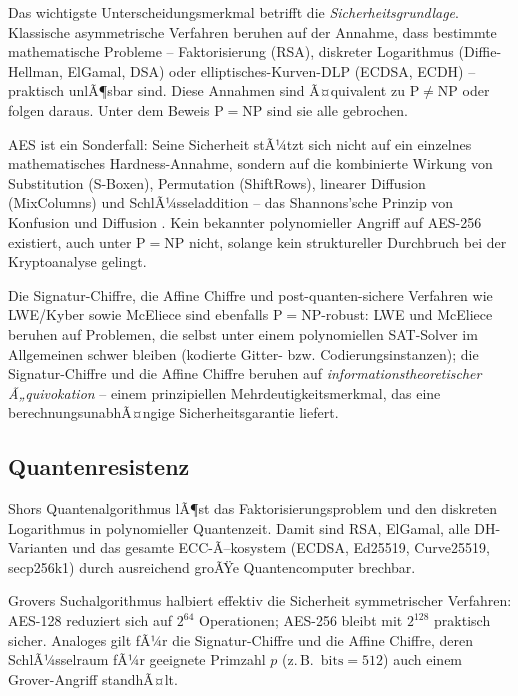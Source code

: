 ﻿\documentclass[a4paper,12pt]{scrreprt}
\theoremstyle{definition}
\begin{document}
Das wichtigste Unterscheidungsmerkmal betrifft die \emph{Sicherheitsgrundlage}. Klassische asymmetrische Verfahren beruhen auf der Annahme, dass bestimmte mathematische Probleme -- Faktorisierung (RSA), diskreter Logarithmus (Diffie-Hellman, ElGamal, DSA) oder elliptisches-Kurven-DLP (ECDSA, ECDH) -- praktisch unlÃ¶sbar sind. Diese Annahmen sind Ã¤quivalent zu $\mathrm{P}\neq\mathrm{NP}$ oder folgen daraus. Unter dem Beweis $\mathrm{P}=\mathrm{NP}$ \cite{Epp26a} sind sie alle gebrochen.

AES \cite{DR02} ist ein Sonderfall: Seine Sicherheit stÃ¼tzt sich nicht auf ein einzelnes mathematisches Hardness-Annahme, sondern auf die kombinierte Wirkung von Substitution (S-Boxen), Permutation (ShiftRows), linearer Diffusion (MixColumns) und SchlÃ¼sseladdition -- das Shannons'sche Prinzip von Konfusion und Diffusion \cite{Sha49}. Kein bekannter polynomieller Angriff auf AES-256 existiert, auch unter $\mathrm{P}=\mathrm{NP}$ nicht, solange kein struktureller Durchbruch bei der Kryptoanalyse gelingt.

Die Signatur-Chiffre, die Affine Chiffre \cite{Epp26c} und post-quanten-sichere Verfahren wie LWE/Kyber \cite{ABD+22} sowie McEliece \cite{McE78} sind ebenfalls $\mathrm{P}=\mathrm{NP}$-robust: LWE und McEliece beruhen auf Problemen, die selbst unter einem polynomiellen SAT-Solver im Allgemeinen schwer bleiben (kodierte Gitter- bzw. Codierungsinstanzen); die Signatur-Chiffre und die Affine Chiffre beruhen auf \emph{informationstheoretischer Ã„quivokation} -- einem prinzipiellen Mehrdeutigkeitsmerkmal, das eine berechnungsunabhÃ¤ngige Sicherheitsgarantie liefert.

\subsection{Quantenresistenz}

Shors Quantenalgorithmus \cite{Sho94} lÃ¶st das Faktorisierungsproblem und den diskreten Logarithmus in polynomieller Quantenzeit. Damit sind RSA, ElGamal, alle DH-Varianten und das gesamte ECC-Ã–kosystem (ECDSA, Ed25519, Curve25519, secp256k1) durch ausreichend groÃŸe Quantencomputer brechbar.

Grovers Suchalgorithmus \cite{Gro96} halbiert effektiv die Sicherheit symmetrischer Verfahren: AES-128 reduziert sich auf $2^{64}$ Operationen; AES-256 bleibt mit $2^{128}$ praktisch sicher. Analoges gilt fÃ¼r die Signatur-Chiffre und die Affine Chiffre, deren SchlÃ¼sselraum fÃ¼r geeignete Primzahl $p$ (z.\,B.\ $\mathrm{bits}=512$) auch einem Grover-Angriff standhÃ¤lt.
\end{document}
